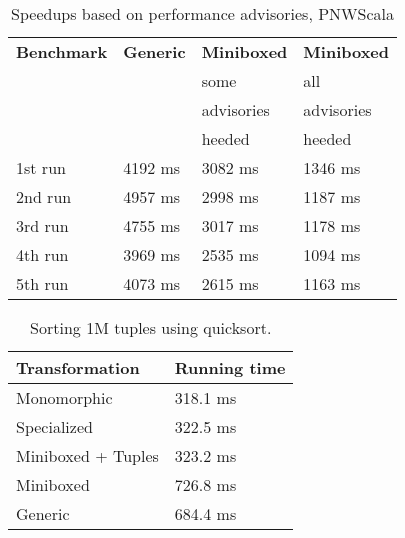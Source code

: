 \begin{table}[t]
  \centering
  \begin{tabularx}{0.48\textwidth}{|g *{3}{|Y}|} \hline
    \textbf{Benchmark} & \textbf{Generic}      & \textbf{Miniboxed}     & \textbf{Miniboxed} \\
        &                       &  some                  &  all               \\
        &                       &  advisories            &  advisories        \\
        &                       &  heeded                &  heeded            \\ \hline
    1st run            &               4192 ms &               3082 ms &             1346 ms \\
    2nd run            &               4957 ms &               2998 ms &             1187 ms \\
    3rd run            &               4755 ms &               3017 ms &             1178 ms \\
    4th run            &               3969 ms &               2535 ms &             1094 ms \\
    5th run            &               4073 ms &               2615 ms &             1163 ms \\ \hline
  \end{tabularx}
  \vspace{-2mm}
  \caption{Speedups based on performance advisories, PNWScala}
  \label{table:pureimage}
  \vspace{-1em}
\end{table}

\begin{table}[b]
  \begin{tabularx}{0.48\textwidth}{|g *{1}{|Y}|} \hline
    \textbf{Transformation} & \textbf{Running time}  \\ \hline
    Monomorphic             &              318.1 ms  \\
    Specialized             &              322.5 ms  \\
    Miniboxed + Tuples      &              323.2 ms  \\
    Miniboxed               &              726.8 ms  \\
    Generic                 &              684.4 ms  \\ \hline
  \end{tabularx}
  \vspace{-2mm}
  \caption{Sorting 1M tuples using quicksort.}
  \label{table:tuple}
  \vspace{-1em}
\end{table}

